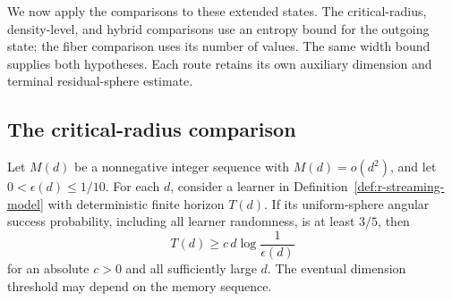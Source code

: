 We now apply the comparisons to these extended states.  The
critical-radius, density-level, and hybrid comparisons use an entropy
bound for the outgoing state; the fiber comparison uses its number of values.  The
same width bound supplies both hypotheses.  Each route retains its own
auxiliary dimension and terminal residual-sphere estimate.

\subsection{The critical-radius comparison}
\label{subsec:r-critical-application}

\begin{theorem}
\label{thm:r-critical-streaming}
Let \(M(d)\) be a nonnegative integer sequence with \(M(d)=o(d^2)\),
and let \(0<\epsilon(d)\le1/10\).  For each \(d\), consider a learner
in Definition~\ref{def:r-streaming-model} with deterministic finite
horizon \(T(d)\).  If its uniform-sphere angular success probability,
including all learner randomness, is at least \(3/5\), then
\[
 T(d)\ge c\,d\log\frac1{\epsilon(d)}
\]
for an absolute \(c>0\) and all sufficiently large \(d\).  The
eventual dimension threshold may depend on the memory sequence.
\end{theorem}

